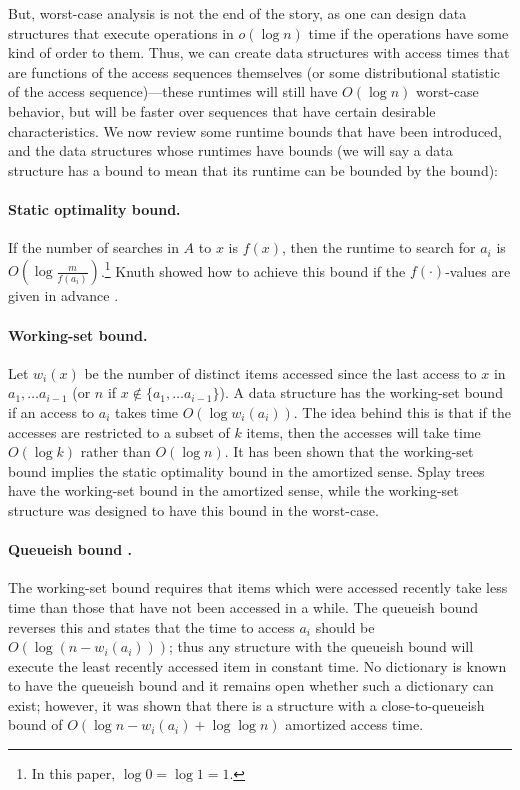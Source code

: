 \documentclass{llncs}
\newcommand{\BigOh}[1]{O\!\left(#1\right)}
\newcommand{\LittleOh}[1]{o\!\left(#1\right)}
\begin{document}
But, worst-case analysis is not the end of the story, as one can design data structures that execute operations in $\LittleOh{\log n}$ time if the operations have some kind of order to them. Thus, we can create data structures with access times that are functions of the access sequences themselves (or some distributional statistic of the access sequence)---these runtimes will still have $\BigOh{\log n}$ worst-case behavior, but will be faster over sequences that have certain desirable characteristics. We now review some runtime bounds that have been introduced, and the data structures whose runtimes have bounds (we will say a data structure has a bound to mean that its runtime can be bounded by the bound):

\paragraph{Static optimality bound.} If the number of searches in $A$ to $x$ is $f(x)$, then the runtime to search for $a_i$ is $\BigOh{\log \frac{m}{f(a_i)}}$.\footnote{In this paper,  $\log 0=\log 1=1$.} Knuth showed how to achieve this bound if the $f(\cdot)$-values are given in advance \cite{DBLP:journals/acta/Knuth71}.

\paragraph{Working-set bound.} Let $w_i(x)$ be the number of distinct items accessed since the last access to $x$ in $a_1, \ldots a_{i-1}$ (or $n$ if $x \notin \{a_1, \ldots a_{i-1}\}$). A data structure has the working-set bound if an access to $a_i$ takes time $\BigOh{\log w_i(a_i)}$. The idea behind this is that if the accesses are restricted to a subset of $k$ items, then the accesses will take time $\BigOh{\log k}$ rather than $\BigOh{\log n}$. It has been shown that the working-set bound implies the static optimality bound in the amortized sense. Splay trees \cite{DBLP:journals/jacm/SleatorT85} have the working-set bound in the amortized sense, while the working-set structure \cite{DBLP:conf/soda/Iacono01a} was designed to have this bound in the worst-case.

\paragraph{Queueish bound \cite{DBLP:journals/algorithmica/IaconoL05}.} The working-set bound requires that items which were accessed recently take less time than those that have not been accessed in a while. The queueish bound reverses this and states that the time to access $a_i$ should be $\BigOh{\log( n-w_i(a_i))}$; thus any structure with the queueish bound will execute the least recently accessed item in constant time. No dictionary is known to have the queueish bound and it remains open whether such a dictionary can exist; however, it was shown that there is a structure with a close-to-queueish bound of $\BigOh{\log n-w_i(a_i)+\log \log n}$ amortized access time.
\end{document}
